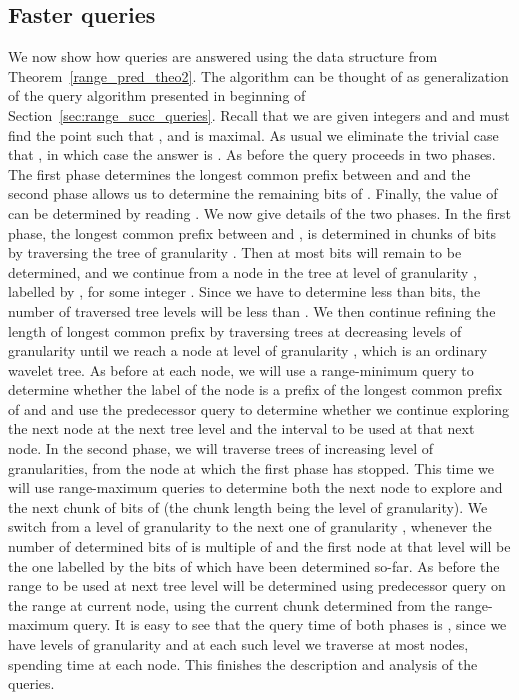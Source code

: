 \documentclass[11pt,runningheads]{llncs}
\begin{document}
{\subsection{Faster queries}
\label{subsec:faster_range_pred}
We now show how queries are answered using the data structure
from Theorem~\ref{range_pred_theo2}. The algorithm can be thought of as generalization 
of the query algorithm presented in beginning of Section~\ref{sec:range_succ_queries}. 
Recall that we are given integers  and  and must find the point 
such that ,  and  is maximal. 
As usual we eliminate the trivial case that , 
in which case the answer is . 
As before the query proceeds in two phases. The first phase
determines the longest common prefix between  and 
and the second phase allows us to determine the remaining bits 
of . Finally, the value of  can be determined by reading . 
We now give details of the two phases. 
In the first phase, the longest common prefix between  and , is determined 
in chunks of  bits by traversing the tree of granularity 
. Then at most  bits will remain to be determined, 
and we continue from a node in the tree at level of granularity , 
labelled by , for some integer .
Since we have to determine less than  bits, the number of traversed 
tree levels will be less than . We then continue refining the length of 
longest common prefix by traversing trees at decreasing levels of granularity until 
we reach a node at level of granularity , which is an ordinary wavelet tree. 
As before at each node, we will use a range-minimum query to determine whether the label 
of the node is a prefix of the longest common prefix of  and  and use the  
predecessor query to determine whether we continue exploring the next node at the next tree level
and the interval to be used at that next node. 
In the second phase, we will traverse trees of increasing level of granularities, 
from the node at which the first phase has stopped. 
This time we will use range-maximum queries to determine both the next node 
to explore and the next chunk of bits of  (the chunk length being the 
level of granularity). We switch from a level of granularity  to the next 
one of granularity , whenever the number of determined bits of  
is multiple of  and the first node at that level will be the one 
labelled by the bits of  which have been determined so-far. 
As before the range to be used at next tree level will be determined using predecessor 
query on the range at current node, using the current chunk determined from the 
range-maximum query. 
It is easy to see that the query time of both phases is , 
since we have  levels of granularity and at each such level we traverse 
at most  nodes, spending  time at each node. 
This finishes the description and analysis of the queries. 

}
\end{document}
